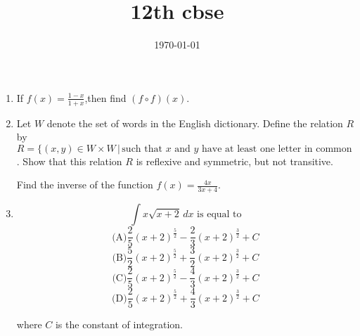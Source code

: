 \documentclass[12pt]{article}
\title{12th cbse}
\date{\today}
\begin{document}
\begin{enumerate}

\item If \(f(x)=\frac{1-x}{1+x}\),then find \((f\circ f)(x)\).

\item Let \( W \) denote the set of words in the English dictionary. Define the relation \( R \) by \( R = \{(x, y) \in W \times W \,|\, \text{such that } x \text{ and } y \text{ have at least one letter in common}\). Show that this relation \( R \) is reflexive and symmetric, but not transitive.

Find the inverse of the function \( f(x) = \frac{4x}{3x+4} \).

\item \[
\int x \sqrt{x + 2} \,dx \text{ is equal to}
\]
\[
\text{(A)} \frac{2}{5}(x + 2)^{\frac{5}{2}} - \frac{2}{3}(x + 2)^{\frac{3}{2}} + C
\]
\[
\text{(B)} \frac{5}{2}(x + 2)^{\frac{5}{2}} + \frac{3}{2}(x + 2)^{\frac{3}{2}} + C
\]
\[
\text{(C)}\frac{2}{5}(x + 2)^{\frac{5}{2}} - \frac{4}{3}(x + 2)^{\frac{3}{2}} + C
\]
\[
\text{(D)} \frac{2}{5}(x + 2)^{\frac{5}{2}} + \frac{4}{3}(x + 2)^{\frac{3}{2}} + C
\]

where \(C\) is the constant of integration.
\end{enumerate}
\end{document}
